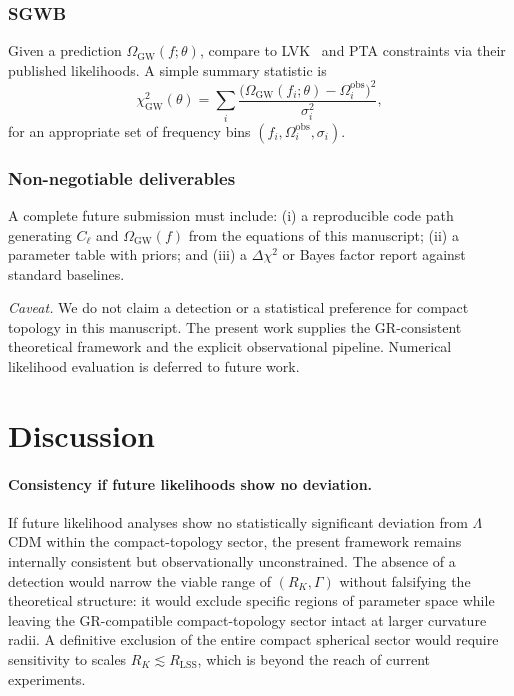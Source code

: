 \documentclass[12pt,a4paper]{article}
\newcommand{\RK}{R_K}
\begin{document}
\subsubsection*{SGWB}

Given a prediction $\Omega_{\mathrm{GW}}(f;\theta)$, compare
to LVK~\cite{LVK2021} and PTA constraints via their
published likelihoods. A simple summary statistic is
\begin{equation}
  \chi^2_{\mathrm{GW}}(\theta)
  = \sum_i
  \frac{\bigl(\Omega_{\mathrm{GW}}(f_i;\theta) - \Omega_i^{\mathrm{obs}}\bigr)^2}
       {\sigma_i^2},
  \label{eq:chiGW}
\end{equation}
for an appropriate set of frequency bins $(f_i,
\Omega_i^{\mathrm{obs}}, \sigma_i)$.

\subsubsection*{Non-negotiable deliverables}

A complete future submission must include: (i) a
reproducible code path generating $C_\ell$ and
$\Omega_{\mathrm{GW}}(f)$ from the equations of this
manuscript; (ii) a parameter table with priors; and
(iii) a $\Delta\chi^2$ or Bayes factor report against
standard baselines.

\medskip
\noindent
\emph{Caveat.} We do not claim a detection or a statistical
preference for compact topology in this manuscript. The
present work supplies the GR-consistent theoretical
framework and the explicit observational pipeline. Numerical
likelihood evaluation is deferred to future work.

\section{Discussion}
\label{sec:disc}

\paragraph{Consistency if future likelihoods show no deviation.}
If future likelihood analyses show no statistically
significant deviation from $\Lambda$CDM within the
compact-topology sector, the present framework remains
internally consistent but observationally unconstrained.
The absence of a detection would narrow the viable range
of $(\RK, \Gamma)$ without falsifying the theoretical
structure: it would exclude specific regions of parameter
space while leaving the GR-compatible compact-topology
sector intact at larger curvature radii. A definitive
exclusion of the entire compact spherical sector would
require sensitivity to scales $\RK \lesssim R_{\mathrm{LSS}}$,
which is beyond the reach of current experiments.
\end{document}
